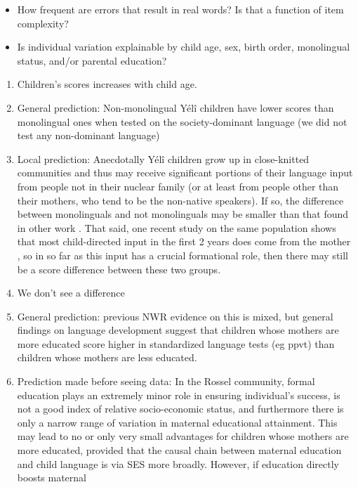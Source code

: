\documentclass[english,,man,floatsintext]{apa6}
\providecommand{\tightlist}{%
  \setlength{\itemsep}{0pt}\setlength{\parskip}{0pt}}
\begin{document}
\begin{itemize}
\tightlist
\item
  How frequent are errors that result in real words? Is that a function
  of item complexity?
\item
  Is individual variation explainable by child age, sex, birth order,
  monolingual status, and/or parental education?
\end{itemize}

\begin{enumerate}
\def\labelenumi{\arabic{enumi}.}
\setcounter{enumi}{2}
\item
  Children's scores increases with child age.
\item
  General prediction: Non-monolingual Yélî children have lower scores
  than monolingual ones when tested on the society-dominant language (we
  did not test any non-dominant language) 
\item
  Local prediction: Anecdotally Yélî children grow up in close-knitted
  communities and thus may receive significant portions of their
  language input from people not in their nuclear family (or at least
  from people other than their mothers, who tend to be the non-native
  speakers). If so, the difference between monolinguals and not
  monolinguals may be smaller than that found in other work . That said,
  one recent study on the same population shows that most child-directed
  input in the first 2 years does come from the mother , so in so far as
  this input has a crucial formational role, then there may still be a
  score difference between these two groups.
\item
  We don't see a difference
\item
  General prediction: previous NWR evidence on this is mixed, but
  general findings on language development suggest that children whose
  mothers are more educated score higher in standardized language tests
  (eg ppvt) than children whose mothers are less educated.
\item
  Prediction made before seeing data: In the Rossel community, formal
  education plays an extremely minor role in ensuring individual's
  success, is not a good index of relative socio-economic status, and
  furthermore there is only a narrow range of variation in maternal
  educational attainment. This may lead to no or only very small
  advantages for children whose mothers are more educated, provided that
  the causal chain between maternal education and child language is via
  SES more broadly. However, if education directly boosts maternal

\end{enumerate}
\end{document}
